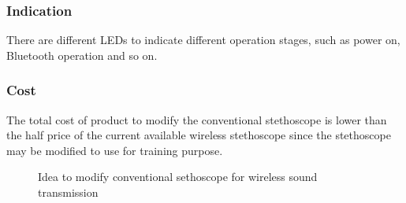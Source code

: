 \subsubsection{Indication}
There are different LEDs to indicate different operation stages, such as power on, Bluetooth operation and so on.

\subsubsection{Cost}
The total cost of product to modify the conventional stethoscope is lower than the half price of the current available wireless stethoscope since the stethoscope may be modified to use for training purpose.

\begin{figure}[!htbp]
	\centering
	\caption{Idea to modify conventional sethoscope for wireless sound transmission}
	\label{fig:design_idea}
\end{figure}